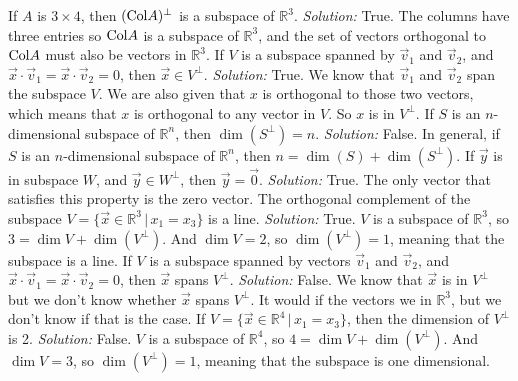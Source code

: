 \ifnum {}         
    If $A$ is $3\times4$, then $(\text{Col} A)^{\perp}$ is a subspace of $\mathbb R^3$.   
    \ifnum {} {\color{DarkBlue} \textit{Solution:  } True. The columns have three entries so $\text{Col} A$ is a subspace of $\mathbb R^3$, and the set of vectors orthogonal to $\text{Col} A$ must also be vectors in $\mathbb R^3$. } \fi
\fi
\ifnum {}      
    If $ V$ is a subspace spanned by $ \vec v_1$ and $ \vec v_2$, and $ \vec x \cdot \vec v_1 = \vec x \cdot \vec v_2 =0$, then $ \vec x \in V ^{\perp}$. 
    \ifnum {} {\color{DarkBlue} \textit{Solution:  } True. We know that $\vec v_1$ and $\vec v_2$ span the subspace $V$. We are also given that $x$ is orthogonal to those two vectors, which means that $x$ is orthogonal to any vector in $V$. So $x$ is in $V^{\perp}$. } \fi
\fi    
\ifnum {}  
    If $S$ is an $n$-dimensional subspace of $\mathbb R^n$, then $\dim(S^{\perp}) = n$.
    \ifnum {} {\color{DarkBlue} \textit{Solution:  } False. In general, if $S$ is an $n$-dimensional subspace of $\mathbb R^n$, then $n = \dim(S) + \dim(S^{\perp})$. } \fi
\fi    
\ifnum {}    
    If $\vec y$ is in subspace $W$, and $\vec y \in W^{\perp}$, then $\vec y= \vec 0$.
    \ifnum {} {\color{DarkBlue} \textit{Solution:  } True. The only vector that satisfies this property is the zero vector. } \fi
\fi   
\ifnum {}    
    The orthogonal complement of the subspace $V = \{ \vec x \in \mathbb R^3 \, | \, x_1 = x_3 \}$ is a line. 
    \ifnum {} {\color{DarkBlue} \textit{Solution:  } True. $V$ is a subspace of $\mathbb R^3$, so $3 = \dim V + \dim(V^{\perp})$. And $\dim V = 2$, so $\dim( V^{\perp})=1$, meaning that the subspace is a line. } \fi
\fi    
\ifnum {}      
    If $ V$ is a subspace spanned by vectors $ \vec v_1$ and $ \vec v_2$, and $ \vec x \cdot \vec v_1 = \vec x \cdot \vec v_2 =0$, then $ \vec x$ spans $V ^{\perp}$. 
    \ifnum {} {\color{DarkBlue} \textit{Solution:  } False. We know that $\vec x$ is in $V^{\perp}$ but we don't know whether $\vec x$ spans $V^{\perp}$. It would if the vectors we in $\mathbb R^3$, but we don't know if that is the case. } \fi
\fi        
\ifnum {} 
   If $V = \{ \vec x \in \mathbb R^4 \, | \, x_1 = x_3 \}$, then the dimension of $V^{\perp}$ is 2. 
    \ifnum {} {\color{DarkBlue} \textit{Solution:  } False. $V$ is a subspace of $\mathbb R^4$, so $4 = \dim V + \dim(V^{\perp})$. And $\dim V = 3$, so $\dim( V^{\perp})=1$, meaning that the subspace is  one dimensional. } 
  \fi
\fi     
\ifnum {}
